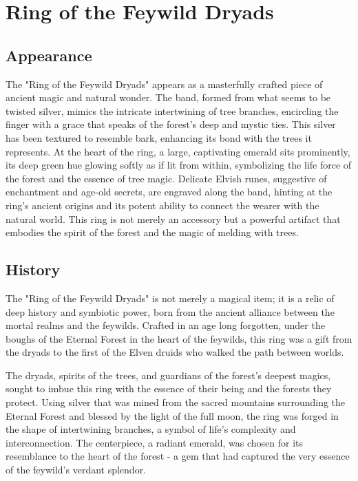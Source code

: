 \documentclass[letterpaper,openany,oneside,twocolumn]{book}
\begin{document}
\chapter*{Ring of the Feywild Dryads}
\section*{Appearance}
The "Ring of the Feywild Dryads" appears as a masterfully crafted piece of ancient magic and natural wonder. The band, formed from what seems to be twisted silver, mimics the intricate intertwining of tree branches, encircling the finger with a grace that speaks of the forest's deep and mystic ties. This silver has been textured to resemble bark, enhancing its bond with the trees it represents. At the heart of the ring, a large, captivating emerald sits prominently, its deep green hue glowing softly as if lit from within, symbolizing the life force of the forest and the essence of tree magic. Delicate Elvish runes, suggestive of enchantment and age-old secrets, are engraved along the band, hinting at the ring's ancient origins and its potent ability to connect the wearer with the natural world. This ring is not merely an accessory but a powerful artifact that embodies the spirit of the forest and the magic of melding with trees.
\vfill\eject
\section*{History}
The "Ring of the Feywild Dryads" is not merely a magical item; it is a relic of deep history and symbiotic power, born from the ancient alliance between the mortal realms and the feywilds. Crafted in an age long forgotten, under the boughs of the Eternal Forest in the heart of the feywilds, this ring was a gift from the dryads to the first of the Elven druids who walked the path between worlds.

The dryads, spirits of the trees, and guardians of the forest's deepest magics, sought to imbue this ring with the essence of their being and the forests they protect. Using silver that was mined from the sacred mountains surrounding the Eternal Forest and blessed by the light of the full moon, the ring was forged in the shape of intertwining branches, a symbol of life's complexity and interconnection. The centerpiece, a radiant emerald, was chosen for its resemblance to the heart of the forest - a gem that had captured the very essence of the feywild's verdant splendor.
\end{document}
